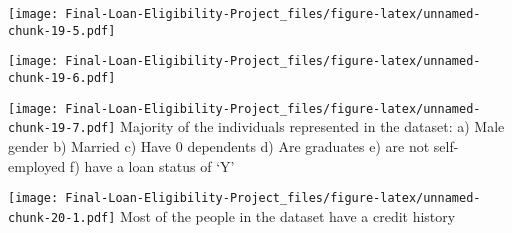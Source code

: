 \documentclass[
]{article}
\newenvironment{Shaded}{\begin{snugshade}}{\end{snugshade}}
\newcommand{\AttributeTok}[1]{\textcolor[rgb]{0.77,0.63,0.00}{#1}}
\newcommand{\CommentTok}[1]{\textcolor[rgb]{0.56,0.35,0.01}{\textit{#1}}}
\newcommand{\DecValTok}[1]{\textcolor[rgb]{0.00,0.00,0.81}{#1}}
\newcommand{\FunctionTok}[1]{\textcolor[rgb]{0.00,0.00,0.00}{#1}}
\newcommand{\NormalTok}[1]{#1}
\newcommand{\SpecialCharTok}[1]{\textcolor[rgb]{0.00,0.00,0.00}{#1}}
\newcommand{\StringTok}[1]{\textcolor[rgb]{0.31,0.60,0.02}{#1}}
\begin{document}
\texttt{[image: Final-Loan-Eligibility-Project\_files/figure-latex/unnamed-chunk-19-5.pdf]}

\begin{Shaded}
\end{Shaded}

\texttt{[image: Final-Loan-Eligibility-Project\_files/figure-latex/unnamed-chunk-19-6.pdf]}

\begin{Shaded}
\end{Shaded}

\texttt{[image: Final-Loan-Eligibility-Project\_files/figure-latex/unnamed-chunk-19-7.pdf]}
Majority of the individuals represented in the dataset: a) Male gender
b) Married c) Have 0 dependents d) Are graduates e) are not
self-employed f) have a loan status of `Y'

\begin{Shaded}
\end{Shaded}

\texttt{[image: Final-Loan-Eligibility-Project\_files/figure-latex/unnamed-chunk-20-1.pdf]}
Most of the people in the dataset have a credit history
\end{document}

